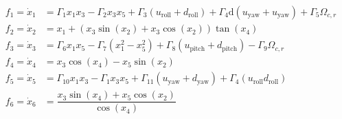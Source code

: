 \documentclass[3p]{elsarticle}
\begin{document}
\begin{align}
    f_1 = \dot{x}_1 &= \Gamma_1 x_1 x_3 - \Gamma_2 x_3 x_5 + \Gamma_3  (u_{\text{roll}} + d_{\text{roll}})
 + \Gamma_4 \mathrm{d} (u_{\text{yaw}} + u_{\text{yaw}}) 
+ \Gamma_5 \Omega_{c, r}  \label{eq:eq_of_motion_start1} \\
    f_2 = \dot{x}_2 &= x_1 + (x_3\sin(x_2) + x_3\cos(x_2))\tan(x_4)  \\
    f_3 = \dot{x}_3 &= \Gamma_6 x_1 x_5 - \Gamma_7 (x_1^2 - x_5^2) + \Gamma_8  (u_{\text{pitch}} + d_{\text{pitch}})- \Gamma_9 \Omega_{c, r} \\
    f_4 = \dot{x}_4 &= x_3\cos(x_4) - x_5\sin(x_2) \\
    f_5 = \dot{x}_5 &= \Gamma_{10} x_1 x_3 - \Gamma_{1} x_3 x_5 + \Gamma_{11} (u_{\text{yaw}} + d_{\text{yaw}}) + \Gamma_{4}(u_{\text{roll}} d_{\text{roll}})\\
    f_6 = \dot{x}_6 &= \dfrac{x_3\sin(x_4) + x_5\cos(x_2)}{\cos(x_4)}~\label{eq:eq_of_motion_end1}
\end{align}
\end{document}
